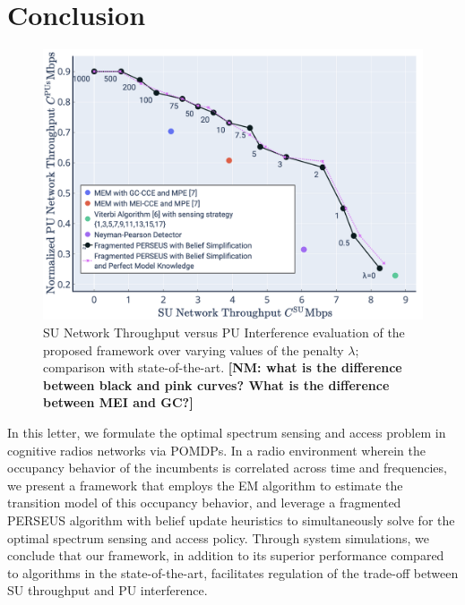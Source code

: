 \documentclass[10pt,twocolumn]{IEEEtran}
\newcommand{\nm}[1]{{\color{blue}\bf{[NM: #1]}}}
\begin{document}
\section{Conclusion}\label{V}
\begin{figure}
    \centering
    \includegraphics[width=1.0\linewidth]{SU_Throughput_PU_Interference_Varying_Penalty.png}
    \caption{SU Network Throughput versus PU Interference evaluation of the proposed framework over varying values of the penalty $\lambda$; comparison with state-of-the-art.
    \nm{what is the difference between black and pink curves? What is the difference between MEI and GC?}
    }
    \vspace{-5mm}
    \label{fig:8}
\end{figure}
In this letter, we formulate the optimal spectrum sensing and access problem in cognitive radios networks via POMDPs. In a radio environment wherein the occupancy behavior of the incumbents is correlated across time and frequencies, we present a framework that employs the EM algorithm to estimate the transition model of this occupancy behavior, and leverage a fragmented PERSEUS algorithm with belief update heuristics to simultaneously solve for the optimal spectrum sensing and access policy. Through system simulations, we conclude that our framework, in addition to its superior performance compared to algorithms in the state-of-the-art, facilitates regulation of the trade-off between SU throughput and PU interference.

\vspace{-8mm}

\end{document}
